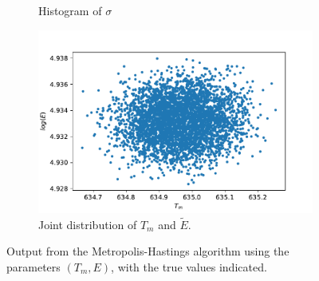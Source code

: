 \begin{figure}[h!]
\begin{subfigure}{0.5\textwidth}
\caption{Histogram of $\sigma$}
\label{HistTsigma}
\end{subfigure}%
\begin{subfigure}{0.5\textwidth}
\centering
\includegraphics[width=\linewidth]{figures/bayesian/Tm/joint_distribution.pdf}
\caption{Joint distribution of $T_m$ and $\tilde{E}$.}
\label{TvsE}
\end{subfigure}
\caption{Output from the Metropolis-Hastings algorithm using the parameters $(T_m,E)$, with the true values indicated.}
\label{fig:MH2}
\end{figure}

